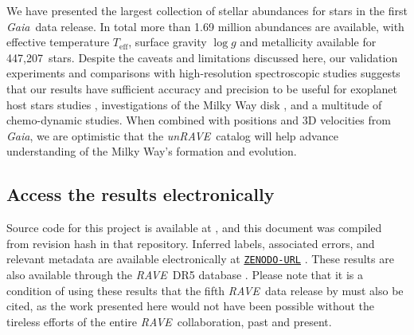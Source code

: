 \documentclass[preprint,trackchanges]{aastex}
\newcommand{\acronym}[1]{{\small{#1}}}
\newcommand{\project}[1]{\textsl{#1}}
\newcommand{\gaia}{\project{Gaia}}
\newcommand{\rave}{\project{\acronym{RAVE}}}
\newcommand{\unrave}{\project{unRAVE}}
\newcommand{\teff}{T_{\mathrm{eff}}}
\newcommand{\logg}{\log g}
\newcommand{\Nstarsqc}{447,207} %
\begin{document}
We have presented the largest collection of stellar abundances for stars in the 
first \gaia\ data release.  In total more than 1.69 million abundances are
available, with effective temperature $\teff$, surface gravity $\logg$ and 
metallicity available for \Nstarsqc\ stars.  Despite the caveats and limitations 
discussed here, our validation experiments and comparisons with high-resolution
spectroscopic studies suggests that our results have sufficient accuracy and
precision to be useful for exoplanet host stars studies 
\citep[c.f.,][]{Valenti_Fischer_2005}, investigations of the Milky Way disk 
\citep[c.f.,][]{Reddy_2003,Reddy_2006,Bensby_2014}, and a multitude of 
chemo-dynamic studies.  When combined with positions and 3D velocities from \gaia,
we are optimistic that the \unrave\ catalog will help advance understanding 
of the Milky Way's formation and evolution.


\subsection*{Access the results electronically}

\noindent{}Source code for this project is available at \texttt{\giturl}\hspace{-0.5em},
and this document was compiled from revision hash \texttt{\githash} in that repository.
Inferred labels, associated errors, and relevant metadata are available electronically
at \texttt{\url{ZENODO-URL}} \citep{DATA_REPOSITORY}.  These results are also available
through the \rave\ DR5 database \citep{Kunder_2016}. Please note that it is a condition
of using these results that the fifth \rave\ data release by \citet{Kunder_2016} must 
also be cited, as the work presented here would not have been possible without the 
tireless efforts of the entire \rave\ collaboration, past and present.
\end{document}
